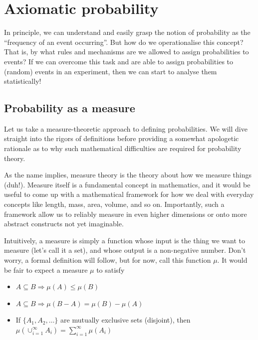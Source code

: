 \documentclass[
]{book}
\providecommand{\tightlist}{%
  \setlength{\itemsep}{0pt}\setlength{\parskip}{0pt}}
\theoremstyle{definition}
\theoremstyle{definition}
\theoremstyle{definition}
\theoremstyle{definition}
\theoremstyle{remark}
\begin{document}
\hypertarget{axiomatic-probability}{%
\section{Axiomatic probability}\label{axiomatic-probability}}

In principle, we can understand and easily grasp the notion of probability as the ``frequency of an event occurring''.
But how do we operationalise this concept? That is, by what rules and mechanisms are we allowed to assign probabilities to events?
If we can overcome this task and are able to assign probabilities to (random) events in an experiment, then we can start to analyse them statistically!

\hypertarget{probability-as-a-measure}{%
\subsection{Probability as a measure}\label{probability-as-a-measure}}

Let us take a measure-theoretic approach to defining probabilities.
We will dive straight into the rigors of definitions before providing a somewhat apologetic rationale as to why such mathematical difficulties are required for probability theory.

As the name implies, measure theory is the theory about how we measure things (duh!).
Measure itself is a fundamental concept in mathematics, and it would be useful to come up with a mathematical framework for how we deal with everyday concepts like length, mass, area, volume, and so on.
Importantly, such a framework allow us to reliably measure in even higher dimensions or onto more abstract constructs not yet imaginable.

Intuitively, a measure is simply a function whose input is the thing we want to measure (let's call it a set), and whose output is a non-negative number.
Don't worry, a formal definition will follow, but for now, call this function \(\mu\).
It would be fair to expect a measure \(\mu\) to satisfy

\begin{itemize}
\tightlist
\item
  \(A \subseteq B \Rightarrow \mu(A) \leq \mu(B)\)
\item
  \(A \subseteq B \Rightarrow \mu(B-A)= \mu(B) - \mu(A)\)
\item
  If \(\{A_1,A_2,\dots\}\) are mutually exclusive sets (disjoint), then \(\mu\left(\cup_{i=1}^\infty A_i \right) = \sum_{i=1}^\infty \mu(A_i)\)
\end{itemize}
\end{document}

